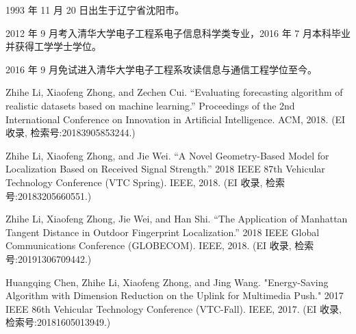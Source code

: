 \begin{resume}


  1993 年 11 月 20 日出生于辽宁省沈阳市。

  2012 年 9 月考入清华大学电子工程系电子信息科学类专业，2016 年 7 月本科毕业并获得工学学士学位。

  2016 年 9 月免试进入清华大学电子工程系攻读信息与通信工程学位至今。


  \begin{publications}
    \item Zhihe Li, Xiaofeng Zhong, and Zechen Cui. “Evaluating forecasting algorithm of realistic datasets based on machine learning.” Proceedings of the 2nd International Conference on Innovation in Artificial Intelligence. ACM, 2018. (EI 收录, 检索号:20183905853244.)
    \item Zhihe Li, Xiaofeng Zhong, and Jie Wei. “A Novel Geometry-Based Model for Localization Based on Received Signal Strength.” 2018 IEEE 87th Vehicular Technology Conference (VTC Spring). IEEE, 2018. (EI 收录, 检索号:20183205660551.)
    \item Zhihe Li, Xiaofeng Zhong, Jie Wei, and Han Shi. “The Application of Manhattan Tangent Distance in Outdoor Fingerprint Localization.” 2018 IEEE Global Communications Conference (GLOBECOM). IEEE, 2018. (EI 收录, 检索号:20191306709442.)
  \end{publications}

    

  \begin{publications}
    \item Huangqing Chen, Zhihe Li, Xiaofeng Zhong, and Jing Wang. "Energy-Saving Algorithm with Dimension Reduction on the Uplink for Multimedia Push." 2017 IEEE 86th Vehicular Technology Conference (VTC-Fall). IEEE, 2017. (EI 收录, 检索号:20181605013949.)
  \end{publications}

    

\end{resume}
